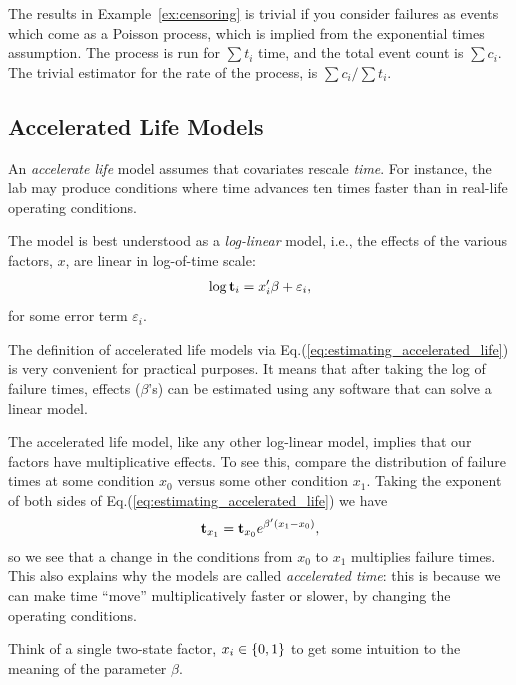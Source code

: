 \begin{extra}
The results in Example~\ref{ex:censoring} is trivial if you consider failures as events which come as a Poisson process, which is implied from the exponential times assumption. 
The process is run for $\sum t_i$ time, and the total event count is $\sum c_i$. 
The trivial estimator for the rate of the process, is $\sum c_i/\sum t_i$.
\end{extra}






\subsection{Accelerated Life Models}
An \emph{accelerate life} model assumes that covariates rescale \emph{time}. 
For instance, the lab may produce conditions where time advances ten times faster than in real-life operating conditions.


The model is best understood as a \emph{log-linear} model, i.e., the effects of the various factors, $x$, are linear in log-of-time scale:
\begin{align}
\label{eq:estimating_accelerated_life}
	\log \mathbf{t}_i = x_i'\beta + \varepsilon_i,
\end{align}
for some error term $\varepsilon_i$. 

The definition of accelerated life models via Eq.(\ref{eq:estimating_accelerated_life}) is very convenient for practical purposes. 
It means that after taking the log of failure times, effects ($\beta$'s) can be estimated using any software that can solve a linear model. 

The accelerated life model, like any other log-linear model, implies that our factors have multiplicative effects.
To see this, compare the distribution of failure times at some condition $x_0$ versus some other condition $x_1$.
Taking the exponent of both sides of Eq.(\ref{eq:estimating_accelerated_life}) we have
\begin{align}
	\mathbf{t}_{x_1} = \mathbf{t}_{x_0} e^{\beta'(x_1-x_0)},
\end{align}
so we see that a change in the conditions from $x_0$ to $x_1$ multiplies failure times. 
This also explains why the models are called \emph{accelerated time}: this is because we can make time ``move'' multiplicatively faster or slower, by changing the operating conditions. 



\begin{think}
	Think of a single two-state factor, $x_i \in\{ 0,1 \}$ to get some intuition to the meaning of the parameter $\beta$. 
\end{think}



